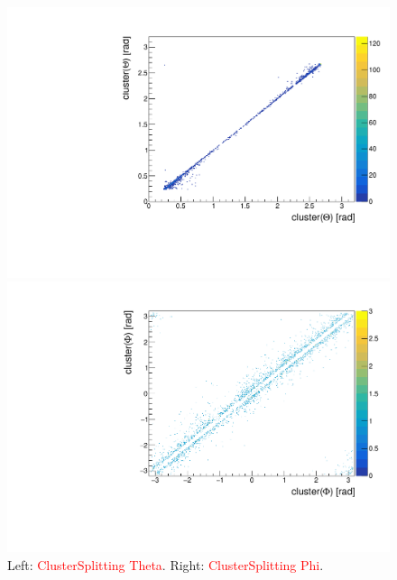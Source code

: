 \documentclass[a4paper,11pt,twosided,final,german,openbib,pdftex,listof=totoc,bibliography=totoc]{scrbook}
\begin{document}
\begin{appendix}
\begin{figure}[H]
	\centering
	\begin{minipage}[b]{0.45\linewidth}
		\centering
		\includegraphics[width=\textwidth]{AnhangPlots/thetathetadoubleMC.pdf}
	\end{minipage}
	\hspace{0.5cm}
	\begin{minipage}[b]{0.45\linewidth}
		\centering
		\includegraphics[width=\textwidth]{AnhangPlots/PhiPhidoubleMC.pdf}
	\end{minipage}
	\caption[Cluster Splitting Angle Distribution]{Left: \textcolor{red}{ClusterSplitting Theta}. Right: \textcolor{red}{ClusterSplitting Phi}.}
	\label{fig:clusterSplittingAngle}
\end{figure}




\end{appendix}
\end{document}
